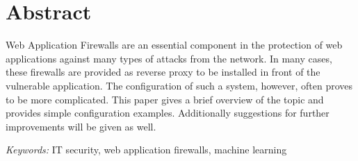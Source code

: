 
\section*{Abstract}
Web Application Firewalls are an essential component in the protection of web applications against many types of attacks from the network. In many cases, these firewalls are provided as reverse proxy to be installed in front of the vulnerable application. The configuration of such a system, however, often proves to be more complicated. This paper gives a brief overview of the topic and provides simple configuration examples. Additionally suggestions for further improvements will be given as well.

\emph{Keywords:} IT security, web application firewalls, machine learning


